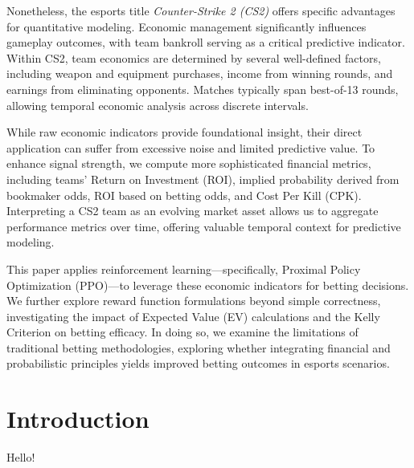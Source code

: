 \documentclass[sigconf]{acmart}
\begin{document}
Nonetheless, the esports title \textit{Counter-Strike 2 (CS2)} offers specific advantages for quantitative modeling. Economic management significantly influences gameplay outcomes, with team bankroll serving as a critical predictive indicator. Within CS2, team economics are determined by several well-defined factors, including weapon and equipment purchases, income from winning rounds, and earnings from eliminating opponents. Matches typically span best-of-13 rounds, allowing temporal economic analysis across discrete intervals.

While raw economic indicators provide foundational insight, their direct application can suffer from excessive noise and limited predictive value. To enhance signal strength, we compute more sophisticated financial metrics, including teams' Return on Investment (ROI), implied probability derived from bookmaker odds, ROI based on betting odds, and Cost Per Kill (CPK). Interpreting a CS2 team as an evolving market asset allows us to aggregate performance metrics over time, offering valuable temporal context for predictive modeling.

This paper applies reinforcement learning—specifically, Proximal Policy Optimization (PPO)—to leverage these economic indicators for betting decisions. We further explore reward function formulations beyond simple correctness, investigating the impact of Expected Value (EV) calculations and the Kelly Criterion on betting efficacy. In doing so, we examine the limitations of traditional betting methodologies, exploring whether integrating financial and probabilistic principles yields improved betting outcomes in esports scenarios.


\section{Introduction}
Hello!
\end{document}
